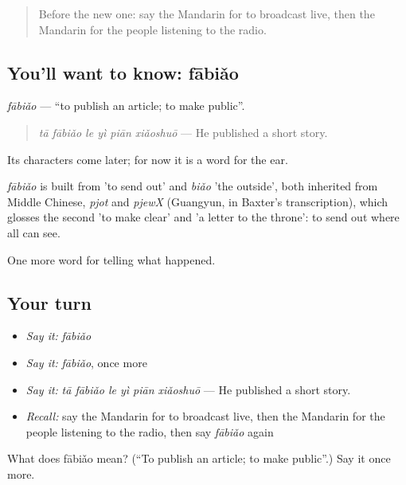 \label{lesson:ZH-C292-fabiao}



\begin{quote}
Before the new one: say the Mandarin for to broadcast live, then the Mandarin for the people listening to the radio.
\end{quote}

\subsection*{You'll want to know: fābiǎo}
\emph{fābiǎo} — \textquotedblleft{}to publish an article; to make public\textquotedblright{}.

\begin{quote}
\emph{tā fābiǎo le yì piān xiǎoshuō} — He published a short story.
\end{quote}

Its characters come later; for now it is a word for the ear.

\begin{cousinweb}
\emph{fābiǎo} is built from  'to send out' and \emph{biǎo} 'the outside', both inherited from Middle Chinese, \emph{pjot} and \emph{pjewX} (Guangyun, in Baxter's transcription), which glosses the second 'to make clear' and 'a letter to the throne': to send out where all can see.
\end{cousinweb}

\begin{grammarlens}[title={What you've built}]
One more word for telling what happened.
\end{grammarlens}

\subsection*{Your turn}
\begin{itemize}
\raggedright
  \item \emph{Say it:} \emph{fābiǎo}
  \item \emph{Say it:} \emph{fābiǎo}, once more
  \item \emph{Say it:} \emph{tā fābiǎo le yì piān xiǎoshuō} — He published a short story.
  \item \emph{Recall:} say the Mandarin for to broadcast live, then the Mandarin for the people listening to the radio, then say \emph{fābiǎo} again
\end{itemize}

\begin{tcolorbox}[breakable,colback=teal!4,colframe=teal!35!black,title={Before you move on}]
What does fābiǎo mean? (\textquotedblleft{}To publish an article; to make public\textquotedblright{}.) Say it once more.
\end{tcolorbox}
